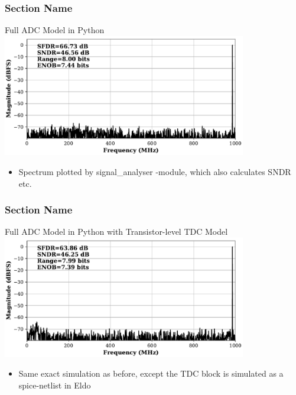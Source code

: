 \documentclass{sdkslides}
\newcommand{\sectname}{Section Name}
\begin{document}
\begin{frame}[c]
    \frametitle{\sectname}
    \centering
    Full ADC Model in Python
    \includegraphics[width=0.8\textwidth]{Pics/latido_fft_py}
    \begin{itemize}
        \item Spectrum plotted by signal\_analyser -module, which also
            calculates SNDR etc.
    \end{itemize}
\end{frame}

\begin{frame}[c]
    \frametitle{\sectname}
    \centering
    Full ADC Model in Python with Transistor-level TDC Model
    \includegraphics[width=0.8\textwidth]{Pics/latido_fft_eldo}
    \begin{itemize}
        \item Same exact simulation as before, except the TDC block is
            simulated as a spice-netlist in Eldo
    \end{itemize}
\end{frame}

\renewcommand{\sectionname}{Example 4: Multi-user MIMO receiver}
\end{document}
